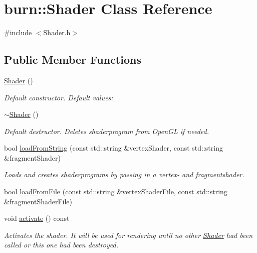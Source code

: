 \hypertarget{classburn_1_1_shader}{\section{burn\-:\-:Shader Class Reference}
\label{classburn_1_1_shader}
}


{\ttfamily \#include $<$Shader.\-h$>$}

\subsection*{Public Member Functions}
\begin{DoxyCompactItemize}
\item 
\hyperlink{classburn_1_1_shader_a9795869452f44ff05a2a4b1f278bc990}{Shader} ()
\begin{DoxyCompactList}\small\item\em Default constructor. Default values\-: \end{DoxyCompactList}\item 
\hyperlink{classburn_1_1_shader_a4f67c0a15b6cf9146869cfbcdbdfb541}{$\sim$\-Shader} ()
\begin{DoxyCompactList}\small\item\em Default destructor. Deletes shaderprogram from Open\-G\-L if needed. \end{DoxyCompactList}\item 
bool \hyperlink{classburn_1_1_shader_ae2975b4b68d38d8aa3d045df082e7c2a}{load\-From\-String} (const std\-::string \&vertex\-Shader, const std\-::string \&fragment\-Shader)
\begin{DoxyCompactList}\small\item\em Loads and creates shaderprograms by passing in a vertex-\/ and fragmentshader. \end{DoxyCompactList}\item 
bool \hyperlink{classburn_1_1_shader_a0c6020d22bc81a2abd3e3c60b8b36bce}{load\-From\-File} (const std\-::string \&vertex\-Shader\-File, const std\-::string \&fragment\-Shader\-File)
\item 
void \hyperlink{classburn_1_1_shader_a8f476e17b38b96d84ea57c31d7aab78d}{activate} () const 
\begin{DoxyCompactList}\small\item\em Activates the shader. It will be used for rendering until no other \hyperlink{classburn_1_1_shader}{Shader} had been called or this one had been destroyed. \end{DoxyCompactList}\item 

\end{DoxyCompactItemize}
